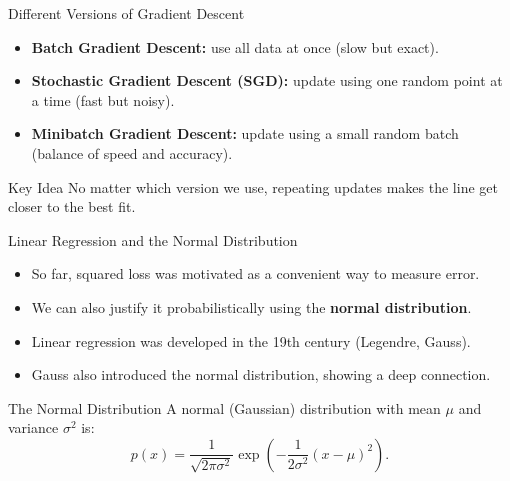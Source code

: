 \documentclass[../../main.tex]{subfiles}
\begin{document}
\begin{frame}{Different Versions of Gradient Descent}
\begin{itemize}
    \item \textbf{Batch Gradient Descent:} use all data at once (slow but exact).
    \item \textbf{Stochastic Gradient Descent (SGD):} update using one random point at a time (fast but noisy).
    \item \textbf{Minibatch Gradient Descent:} update using a small random batch (balance of speed and accuracy).
\end{itemize}

\begin{block}{Key Idea}
No matter which version we use, repeating updates makes the line get closer to the best fit.
\end{block}
\end{frame}


\begin{frame}{Linear Regression and the Normal Distribution}
\begin{itemize}
    \item So far, squared loss was motivated as a convenient way to measure error.
    \item We can also justify it probabilistically using the \textbf{normal distribution}.
    \item Linear regression was developed in the 19th century (Legendre, Gauss).
    \item Gauss also introduced the normal distribution, showing a deep connection.
\end{itemize}
\end{frame}

\begin{frame}{The Normal Distribution}
A normal (Gaussian) distribution with mean $\mu$ and variance $\sigma^2$ is:
\[
p(x) = \frac{1}{\sqrt{2\pi\sigma^2}}
\exp\left( - \frac{1}{2\sigma^2} (x - \mu)^2 \right).
\]
\end{frame}
\end{document}

